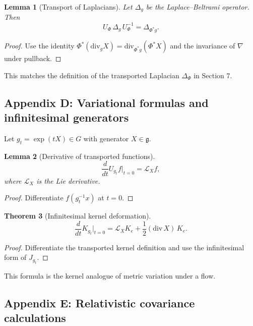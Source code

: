 \documentclass[11pt]{article}
\newtheorem{theorem}{Theorem}[section]
\newtheorem{lemma}[theorem]{Lemma}
\theoremstyle{definition}
\begin{document}
\begin{lemma}[Transport of Laplacians]
	Let $\Delta_g$ be the Laplace–Beltrami operator. Then
	\[
	U_\Phi\, \Delta_g\, U_\Phi^{-1} = \Delta_{\Phi^\ast g}.
	\]
\end{lemma}

\begin{proof}
	Use the identity $\Phi^\ast(\mathrm{div}_g X) = \mathrm{div}_{\Phi^\ast g}(\Phi^\ast X)$ and the invariance of $\nabla$ under pullback.
\end{proof}

This matches the definition of the transported Laplacian $\Delta_\Phi$ in Section 7.

\subsection{Appendix D: Variational formulas and infinitesimal generators}

Let $g_t=\exp(tX)\in G$ with generator $X\in\mathfrak{g}$.

\begin{lemma}[Derivative of transported functions]
	\[
	\frac{d}{dt} U_{g_t} f\Big|_{t=0}= \mathcal{L}_X f,
	\]
	where $\mathcal{L}_X$ is the Lie derivative.
\end{lemma}

\begin{proof}
	Differentiate $f(g_t^{-1}x)$ at $t=0$.
\end{proof}

\begin{theorem}[Infinitesimal kernel deformation]
	\[
	\frac{d}{dt}K_{g_t}\big|_{t=0}
	= \mathcal{L}_X K_e + \frac12 (\mathrm{div}\,X)\,K_e.
	\]
\end{theorem}

\begin{proof}
	Differentiate the transported kernel definition and use the infinitesimal form of $J_{g_t}$.
\end{proof}

This formula is the kernel analogue of metric variation under a flow.

\subsection{Appendix E: Relativistic covariance calculations}
\end{document}
